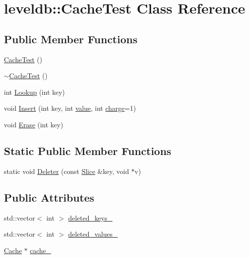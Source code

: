 \hypertarget{classleveldb_1_1_cache_test}{}\section{leveldb\+:\+:Cache\+Test Class Reference}
\label{classleveldb_1_1_cache_test}
\subsection*{Public Member Functions}
\begin{DoxyCompactItemize}
\item 
\hyperlink{classleveldb_1_1_cache_test_abfea0e2ae3ee11b62d1f6b622ef47334}{Cache\+Test} ()
\item 
\hyperlink{classleveldb_1_1_cache_test_a2591fd9f81069e507206aef8f4d91660}{$\sim$\+Cache\+Test} ()
\item 
int \hyperlink{classleveldb_1_1_cache_test_a90d19cd6098f10f809f0c3b94e8b3fc6}{Lookup} (int key)
\item 
void \hyperlink{classleveldb_1_1_cache_test_ad7fc76253a92137e62aede17322c7286}{Insert} (int key, int \hyperlink{cache_8cc_a0f61d63b009d0880a89c843bd50d8d76}{value}, int \hyperlink{cache_8cc_a7476acc4f60747f9d9032e9cbdf5eb79}{charge}=1)
\item 
void \hyperlink{classleveldb_1_1_cache_test_aeaa81bbd9d0fba1fb31b0a8f7aa94397}{Erase} (int key)
\end{DoxyCompactItemize}
\subsection*{Static Public Member Functions}
\begin{DoxyCompactItemize}
\item 
static void \hyperlink{classleveldb_1_1_cache_test_aa8d3ce31a1995da33810f2b5320089ab}{Deleter} (const \hyperlink{classleveldb_1_1_slice}{Slice} \&key, void $\ast$v)
\end{DoxyCompactItemize}
\subsection*{Public Attributes}
\begin{DoxyCompactItemize}
\item 
std\+::vector$<$ int $>$ \hyperlink{classleveldb_1_1_cache_test_aad6b825748f29b973a8934682eb50ed2}{deleted\+\_\+keys\+\_\+}
\item 
std\+::vector$<$ int $>$ \hyperlink{classleveldb_1_1_cache_test_add979edecc72f9740b1d6d4951c13c02}{deleted\+\_\+values\+\_\+}
\item 
\hyperlink{classleveldb_1_1_cache}{Cache} $\ast$ \hyperlink{classleveldb_1_1_cache_test_af2edcc8a47148050ba791f6a2b7a6165}{cache\+\_\+}
\end{DoxyCompactItemize}
